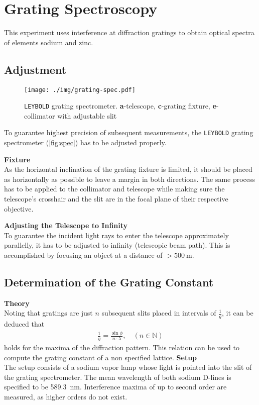 \newcommand{\darc}[2]{\SI{#1}{\degree}\SI{#2}{\arcminute}}

\chapter{Grating Spectroscopy}
This experiment uses interference at diffraction gratings to obtain optical spectra of elements sodium and zinc.

\section{Adjustment}
\begin{figure}
	\centering
	\texttt{[image: ./img/grating-spec.pdf]}
	\caption[\texttt{LEYBOLD} grating spectrometer]{\texttt{LEYBOLD} grating spectrometer. \textbf{a}-telescope, \textbf{c}-grating fixture, \textbf{e}-collimator with adjustable slit}
	\label{fig:spec}
\end{figure}
To guarantee highest precision of subsequent measurements, the \texttt{LEYBOLD} grating spectrometer (\autoref{fig:spec}) has to be adjusted properly.

\textbf{Fixture}\\
As the horizontal inclination of the grating fixture is limited, it should be placed as horizontally as possible to leave a margin in both directions.
The same process has to be applied to the collimator and telescope while making sure the telescope's crosshair and the slit are in the focal plane of their respective objective.

\textbf{Adjusting the Telescope to Infinity}\\
To guarantee the incident light rays to enter the telescope approximately parallelly, it has to be adjusted to infinity (telescopic beam path).
This is accomplished by focusing an object at a distance of $>\SI{500}{\meter}$.

\section{Determination of the Grating Constant}\label{sec:grating}
\textbf{Theory}\\
Noting that gratings are just $n$ subsequent slits placed in intervals of $\frac{1}{g}$, it can be deduced that
\begin{align}
	\frac{1}{g}=\frac{\sin\phi}{n\cdot\lambda},\quad(n\in\mathbb{N}) \label{eq:grating-const}
\end{align}
holds for the maxima of the diffraction pattern.
This relation can be used to compute the grating constant of a non specified lattice.
\textbf{Setup}\\
The setup consists of a sodium vapor lamp whose light is pointed into the slit of the grating spectrometer.
The mean wavelength of both sodium D-lines is specified to be \SI{589.3}{\nm}.
Interference maxima of up to second order are measured, as higher orders do not exist.

